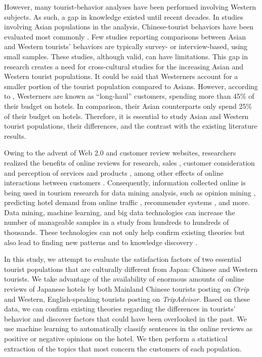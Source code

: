 \documentclass[smallextended,natbib]{svjour3}       %
\begin{document}
  However, many tourist-behavior analyses have been performed involving Western subjects. As such, a gap in knowledge existed until recent decades. In studies involving Asian populations in the analysis, Chinese-tourist behaviors have been evaluated most commonly \cite[e.g.][]{liu2019, chang2010, dongyang2015}. Few studies reporting comparisons between Asian and Western tourists’ behaviors \cite[e.g.][]{choi2000} are typically survey- or interview-based, using small samples. These studies, although valid, can have limitations. This gap in research creates a need for cross-cultural studies for the increasing Asian and Western tourist populations. It could be said that Westerners account for a smaller portion of the tourist population compared to Asians. However, according to \cite{choi2000}, Westerners are known as ``long-haul'' customers, spending more than 45\% of their budget on hotels. In comparison, their Asian counterparts only spend 25\% of their budget on hotels. Therefore, it is essential to study Asian and Western tourist populations, their differences, and the contrast with the existing literature results.

  Owing to the advent of Web 2.0 and customer review websites, researchers realized the benefits of online reviews for research, sales  \cite[][]{ye2009, basuroy2003}, customer consideration \cite[][]{vermeulen2009} and perception of services and products \cite[][]{browning2013}, among other effects of online interactions between customers \cite[e.g.][]{xiang2010, ren2019}. Consequently, information collected online is being used in tourism research for data mining analysis, such as opinion mining \cite[e.g.][]{hu2017436}, predicting hotel demand from online traffic \cite[][]{yang2014}, recommender systems \cite[e.g.][]{loh2003}, and more. Data mining, machine learning, and big data technologies can increase the number of manageable samples in a study from hundreds to hundreds of thousands. These technologies can not only help confirm existing theories but also lead to finding new patterns and to knowledge discovery \cite[][]{fayyad1996data}. 

  In this study, we attempt to evaluate the satisfaction factors of two essential tourist populations that are culturally different from Japan: Chinese and Western tourists. We take advantage of the availability of enormous amounts of online reviews of Japanese hotels by both Mainland Chinese tourists posting on \textit{Ctrip} and Western, English-speaking tourists posting on \textit{TripAdvisor}. Based on these data, we can confirm existing theories regarding the differences in tourists’ behavior and discover factors that could have been overlooked in the past. We use machine learning to automatically classify sentences in the online reviews as positive or negative opinions on the hotel. We then perform a statistical extraction of the topics that most concern the customers of each population.
\end{document}
